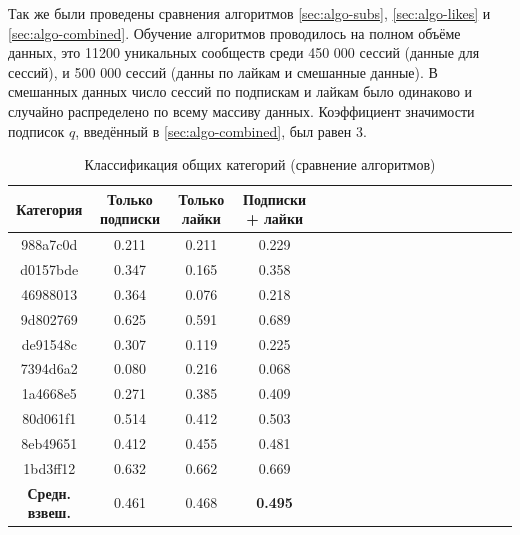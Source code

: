 \documentclass[times,specification,annotation]{itmo-student-thesis}
\begin{document}
Так же были проведены сравнения алгоритмов \ref{sec:algo-subs},  \ref{sec:algo-likes} и  \ref{sec:algo-combined}. Обучение алгоритмов проводилось на полном объёме данных, это 11200 уникальных сообществ среди 450 000 сессий (данные для сессий), и 500 000 сессий (данны по лайкам и смешанные данные). В смешанных данных число сессий по подпискам и лайкам было одинаково и случайно распределено по всему массиву данных. Коэффициент значимости подписок $q$, введённый в \ref{sec:algo-combined}, был равен 3.

\begin{table}[!h]
\caption{Классификация общих категорий (сравнение алгоритмов)}\label{tab-all-g}
\centering
\begin{tabular}{|*{18}{c|}}\hline
Категория & Только подписки  & Только лайки & Подписки + лайки \\\hline
988a7c0d         & 0.211 & 0.211 & 0.229  \\\hline
d0157bde         & 0.347 & 0.165 & 0.358  \\\hline
46988013         & 0.364 & 0.076 & 0.218 \\\hline
9d802769         & 0.625 & 0.591 & 0.689    \\\hline
de91548c         & 0.307 & 0.119 & 0.225 \\\hline
7394d6a2         & 0.080 & 0.216 & 0.068 \\\hline
1a4668e5         & 0.271 & 0.385 & 0.409 \\\hline
80d061f1          & 0.514 & 0.412 & 0.503 \\\hline
8eb49651         & 0.412 & 0.455 & 0.481 \\\hline
1bd3ff12           & 0.632 & 0.662 & 0.669 \\\hline
\textbf{Средн. взвеш.}  & 0.461 & 0.468 & \textbf{0.495}  \\\hline
\end{tabular}
\end{table}
\end{document}
